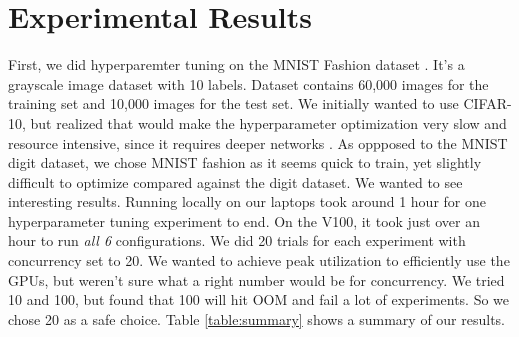 \documentclass{article}
\begin{document}
\section{Experimental Results}
First, we did hyperparemter tuning on the MNIST Fashion dataset \cite{fashion-mnist}. It's a grayscale image dataset with 10 labels. Dataset contains 60,000 images for the training set and 10,000 images for the test set. We initially wanted to use CIFAR-10, but realized that would make the hyperparameter optimization very slow and resource intensive, since it requires deeper networks \cite{cifar10}. As oppposed to the MNIST digit dataset, we chose MNIST fashion as it seems quick to train, yet slightly difficult to optimize compared against the digit dataset. We wanted to see interesting results. Running locally on our laptops took around 1 hour for one hyperparameter tuning experiment to end. On the V100, it took just over an hour to run \textit{all 6} configurations. We did 20 trials for each experiment with concurrency set to 20. We wanted to achieve peak utilization to efficiently use the GPUs, but weren't sure what a right number would be for concurrency. We tried 10 and 100, but found that 100 will hit OOM and fail a lot of experiments. So we chose 20 as a safe choice. Table \ref{table:summary} shows a summary of our results.



\end{document}
